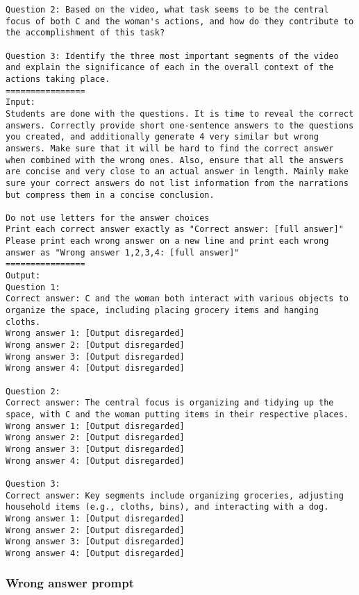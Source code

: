\begin{lstlisting}
Question 2: Based on the video, what task seems to be the central focus of both C and the woman's actions, and how do they contribute to the accomplishment of this task?

Question 3: Identify the three most important segments of the video and explain the significance of each in the overall context of the actions taking place.
================
Input:
Students are done with the questions. It is time to reveal the correct answers. Correctly provide short one-sentence answers to the questions you created, and additionally generate 4 very similar but wrong answers. Make sure that it will be hard to find the correct answer when combined with the wrong ones. Also, ensure that all the answers are concise and very close to an actual answer in length. Mainly make sure your correct answers do not list information from the narrations but compress them in a concise conclusion. 

Do not use letters for the answer choices
Print each correct answer exactly as "Correct answer: [full answer]"
Please print each wrong answer on a new line and print each wrong answer as "Wrong answer 1,2,3,4: [full answer]"
================
Output:
Question 1:
Correct answer: C and the woman both interact with various objects to organize the space, including placing grocery items and hanging cloths.
Wrong answer 1: [Output disregarded]
Wrong answer 2: [Output disregarded]
Wrong answer 3: [Output disregarded]
Wrong answer 4: [Output disregarded]

Question 2:
Correct answer: The central focus is organizing and tidying up the space, with C and the woman putting items in their respective places.
Wrong answer 1: [Output disregarded]
Wrong answer 2: [Output disregarded]
Wrong answer 3: [Output disregarded]
Wrong answer 4: [Output disregarded]

Question 3:
Correct answer: Key segments include organizing groceries, adjusting household items (e.g., cloths, bins), and interacting with a dog.
Wrong answer 1: [Output disregarded]
Wrong answer 2: [Output disregarded]
Wrong answer 3: [Output disregarded]
Wrong answer 4: [Output disregarded]
\end{lstlisting}\subsubsection{Wrong answer prompt}
